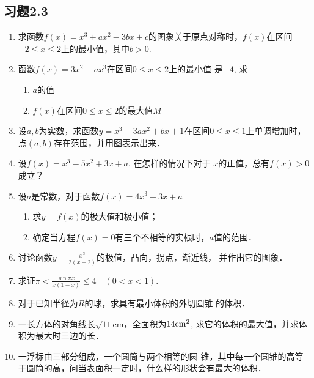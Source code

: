 \subsection*{习题2.3}
\begin{enumerate}
    \item 求函数$f(x)=x^3+ax^2-3bx+c$的图象关于原点对称时，$f(x)$在区间$-2\le x\le 2$上的最小值，其中$b>0$.
    
    \item 函数$f(x)=3x^2-ax^3$在区间$0\le x\le 2$上的最小值
    是$-4$, 求
\begin{enumerate}
    \item $a$的值
    \item $f(x)$在区间$0\le x\le 2$的最大值$M$
\end{enumerate}
\item 设$a,b$为实数，求函数$y=x^3-3ax^2+bx+1$在区间$0\le x\le 1$上单调增加时，点$(a,b)$存在范围，并用图表示出来．

\item 设$f(x)=x^3-5x^2+3x+a$, 在怎样的情况下对于
$x$的正值，总有$f(x)>0$成立？
\item 设$a$是常数，对于函数$f(x)=4x^3-3x+a$
\begin{enumerate}
    \item 求$y=f(x)$的极大值和极小值；
    \item 确定当方程$f(x)=0$有三个不相等的实根时，$a$值的范围．
\end{enumerate}

\item 讨论函数$y=\frac{x^3}{2 (x+2)}$的极值，凸向，拐点，渐近线，
并作出它的图象．

\item 求证$\pi<\frac{\sin\pi x}{x(1-x)}\le 4\quad (0<x<1)$.
\item 对于已知半径为$R$的球，求具有最小体积的外切圆锥
的体积．
\item 一长方体的对角线长$\sqrt{11}$cm，全面积为$14{\rm cm}^2$, 求它的体积的最大值，并求体积为最大时三边的长．
\item 一浮标由三部分组成，一个圆筒与两个相等的圆
锥，其中每一个圆锥的高等于圆筒的高，问当表面积一定时，什么样的形状会有最大的体积．
\end{enumerate}     



